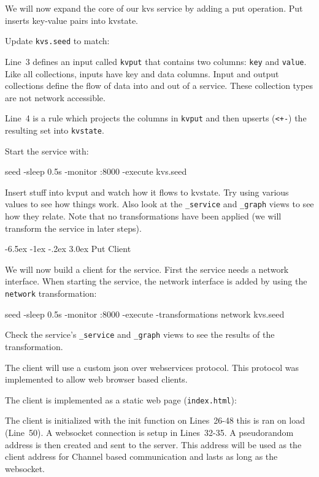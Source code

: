 \documentclass[a5paper,12pt,onecolumn]{article}
\makeatletter
\def\code#1{\mbox{\lstinline{#1}}}
\renewcommand\section{\@startsection {section}{1}{\z@}%
	{-6.5ex \@plus -1ex \@minus -.2ex}%
	{3.0ex}%
	{\sf\Large}}
\makeatother
\begin{document}
We will now expand the core of our kvs service by adding a put operation. Put inserts key-value pairs into kvstate.

Update \code{kvs.seed} to match:



Line~3 defines an input called \code{kvput} that contains two columns: \code{key} and \code{value}. Like all collections, inputs have key and data columns. Input and output collections define the flow of data into and out of a service. These collection types are not network accessible.

Line~4 is a rule which projects the columns in \code{kvput} and then upserts (\code{<+-}) the resulting set into \code{kvstate}.

Start the service with:

\begin{cli}
seed -sleep 0.5s -monitor :8000 -execute kvs.seed
\end{cli}

Insert stuff into kvput and watch how it flows to kvstate. Try using various values to see how things work. Also look at the \code{_service} and \code{_graph} views to see how they relate. Note that no transformations have been applied (we will transform the service in later steps).

\section{Put Client}

We will now build a client for the service. First the service needs a network interface. When starting the service, the network interface is added by using the \code{network} transformation:

\begin{cli}
seed -sleep 0.5s -monitor :8000 -execute -transformations network kvs.seed
\end{cli}

Check the service's \code{_service} and \code{_graph} views to see the results of the transformation.

The client will use a custom json over webservices protocol. This protocol was implemented to allow web browser based clients.

The client is implemented as a static web page (\code{index.html}):



The client is initialized with the init function on Lines~26-48 this is ran on load (Line~50). A websocket connection is setup in Lines~32-35. A pseudorandom address is then created and sent to the server. This address will be used as the client address for Channel based communication and lasts as long as the websocket.
\end{document}
